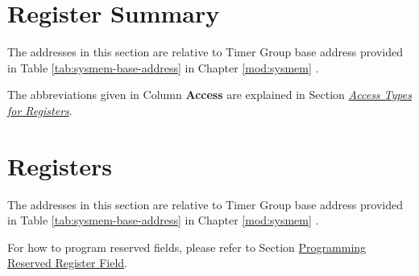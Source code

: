 \documentclass[main\_\_EN.tex]{subfiles}
\begin{document}



\newpage
\hypertarget{timg-reg-summ}{}
\section{Register Summary}
\label{sec:timg-reg-summ}

The addresses in this section are relative to Timer Group base address provided in Table \ref{tab:sysmem-base-address} in Chapter \ref{mod:sysmem} \textit{}.

The abbreviations given in Column \textbf{Access} are explained in Section \hyperref[glossary-access-types]{\textit{Access Types for Registers}}.






\newpage
\section{Registers}

The addresses in this section are relative to Timer Group base address provided in Table \ref{tab:sysmem-base-address} in Chapter \ref{mod:sysmem} \textit{}.

For how to program reserved fields, please refer to Section \hyperref[programming-reserved-field]{Programming Reserved Register Field}.


\end{document}
